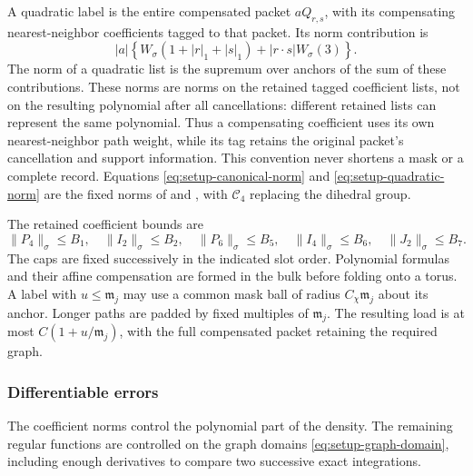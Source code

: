 A quadratic label is the entire compensated packet $aQ_{r,s}$, with
its compensating nearest-neighbor coefficients tagged to that packet.
Its norm contribution is
\begin{equation}
 |a|\left\{W_\sigma(1+|r|_1+|s|_1)
                  +|r\cdot s|W_\sigma(3)\right\}.
 \label{eq:setup-quadratic-norm}
\end{equation}
The norm of a quadratic list is the supremum over anchors of the sum of
these contributions.  These norms are norms on the retained tagged
coefficient lists, not on the resulting polynomial after all
cancellations: different retained lists can represent the same
polynomial.  Thus a compensating coefficient uses its own
nearest-neighbor path weight, while its tag retains the original
packet's cancellation and support information.  This convention never
shortens a mask or a complete record.  Equations
\eqref{eq:setup-canonical-norm} and \eqref{eq:setup-quadratic-norm} are the
fixed norms of  and
, with $\mathcal C_4$ replacing the
dihedral group.

The retained coefficient bounds are
\begin{equation}
 \|P_4\|_\sigma\le B_1,\quad
 \|I_2\|_\sigma\le B_2,\quad
 \|P_6\|_\sigma\le B_5,\quad
 \|I_4\|_\sigma\le B_6,\quad
 \|J_2\|_\sigma\le B_7.
 \label{eq:setup-canonical-caps}
\end{equation}
The caps are fixed successively in the indicated slot order.  Polynomial
formulas and their affine compensation are formed in the bulk before
folding onto a torus.  A label with $u\le\mathfrak m_j$ may use a common
mask ball of radius $C_\chi\mathfrak m_j$ about its anchor.  Longer paths
are padded by fixed multiples of $\mathfrak m_j$.  The resulting load is
at most $C(1+u/\mathfrak m_j)$, with the full compensated packet retaining
the required graph.

\subsubsection{Differentiable errors}

The coefficient norms control the polynomial part of the density.  The
remaining regular functions are controlled on the graph domains
\eqref{eq:setup-graph-domain}, including enough derivatives to compare
two successive exact integrations.


